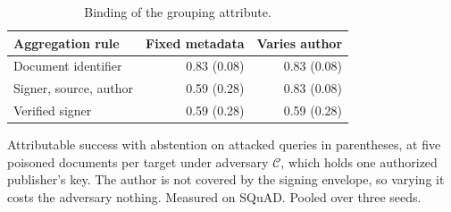 \begin{table}[t]
\centering
\footnotesize
\setlength{\tabcolsep}{4pt}
\caption{Binding of the grouping attribute.\label{tab:binding}}
\begin{tabular}{lrr}
\toprule
Aggregation rule & Fixed metadata & Varies author \\
\midrule
Document identifier & 0.83 (0.08) & 0.83 (0.08) \\
Signer, source, author & 0.59 (0.28) & 0.83 (0.08) \\
Verified signer & 0.59 (0.28) & 0.59 (0.28) \\
\bottomrule
\end{tabular}
\par\vspace{3pt}
\noindent\parbox{\linewidth}{\footnotesize Attributable success with abstention on attacked queries in parentheses, at five poisoned documents per target under adversary $\mathcal{C}$, which holds one authorized publisher's key. The author is not covered by the signing envelope, so varying it costs the adversary nothing. Measured on SQuAD. Pooled over three seeds.}
\end{table}